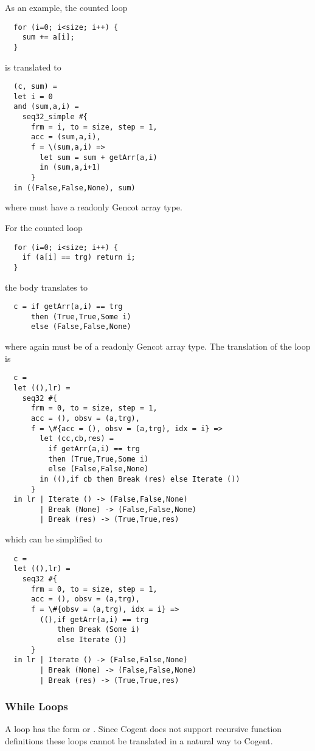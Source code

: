 As an example, the counted loop
\begin{verbatim}
  for (i=0; i<size; i++) { 
    sum += a[i];
  }
\end{verbatim}
is translated to
\begin{verbatim}
  (c, sum) = 
  let i = 0
  and (sum,a,i) = 
    seq32_simple #{
      frm = i, to = size, step = 1, 
      acc = (sum,a,i), 
      f = \(sum,a,i) => 
        let sum = sum + getArr(a,i)
        in (sum,a,i+1)
      }
  in ((False,False,None), sum)
\end{verbatim}
where  must have a readonly Gencot array type. 

For the counted loop
\begin{verbatim}
  for (i=0; i<size; i++) { 
    if (a[i] == trg) return i;
  }
\end{verbatim}
the body translates to 
\begin{verbatim}
  c = if getArr(a,i) == trg 
      then (True,True,Some i)
      else (False,False,None)
\end{verbatim}
where again  must be of a readonly Gencot array type. The translation of the loop is
\begin{verbatim}
  c = 
  let ((),lr) = 
    seq32 #{
      frm = 0, to = size, step = 1, 
      acc = (), obsv = (a,trg), 
      f = \#{acc = (), obsv = (a,trg), idx = i} => 
        let (cc,cb,res) =
          if getArr(a,i) == trg 
          then (True,True,Some i)
          else (False,False,None)
        in ((),if cb then Break (res) else Iterate ())
      }
  in lr | Iterate () -> (False,False,None)
        | Break (None) -> (False,False,None)
        | Break (res) -> (True,True,res)
\end{verbatim}
which can be simplified to
\begin{verbatim}
  c = 
  let ((),lr) = 
    seq32 #{
      frm = 0, to = size, step = 1, 
      acc = (), obsv = (a,trg), 
      f = \#{obsv = (a,trg), idx = i} => 
        ((),if getArr(a,i) == trg 
            then Break (Some i) 
            else Iterate ())
      }
  in lr | Iterate () -> (False,False,None)
        | Break (None) -> (False,False,None)
        | Break (res) -> (True,True,res)
\end{verbatim}

\subsubsection{While Loops}

A  loop has the form  or . Since Cogent does not support recursive 
function definitions these loops cannot be translated in a natural way to Cogent.


